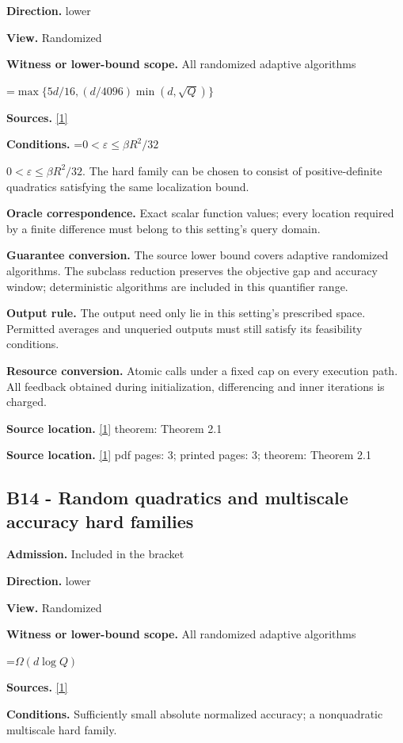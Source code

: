 \documentclass[10pt,a4paper]{article}
\newcommand{\AtlasMath}[1]{\par\begingroup\centering\setbox0=\hbox{$\displaystyle #1$}\ifdim\wd0>1.4\linewidth\typeout{ATLAS WIDE FORMULA: \the\wd0}\fi\ifdim\wd0>\linewidth\resizebox{\linewidth}{!}{\box0}\else\box0\fi\par\endgroup}
\newcommand{\AtlasInlineMath}[1]{\begingroup\setbox0=\hbox{$#1$}\ifdim\wd0>.4\linewidth\endgroup\AtlasMath{#1}\else\endgroup$#1$\fi}
\begin{document}
\textbf{Direction.} lower

\textbf{View.} Randomized

\textbf{Witness or lower-bound scope.} All randomized adaptive algorithms

\AtlasMath{\max\{5d/16,(d/4096)\min(d,\sqrt Q)\}}
\textbf{Sources.} \href{https://arxiv.org/html/2610.00345v1}{[1]}

\textbf{Conditions.} \AtlasInlineMath{0<\varepsilon\le\beta R^2/32}. The hard family can be chosen to consist of positive-definite quadratics satisfying the same localization bound.

\textbf{Oracle correspondence.} Exact scalar function values; every location required by a finite difference must belong to this setting's query domain.

\textbf{Guarantee conversion.} The source lower bound covers adaptive randomized algorithms. The subclass reduction preserves the objective gap and accuracy window; deterministic algorithms are included in this quantifier range.

\textbf{Output rule.} The output need only lie in this setting's prescribed space. Permitted averages and unqueried outputs must still satisfy its feasibility conditions.

\textbf{Resource conversion.} Atomic calls under a fixed cap on every execution path. All feedback obtained during initialization, differencing and inner iterations is charged.

\textbf{Source location.} \href{https://arxiv.org/html/2610.00345v1}{[1]} theorem: Theorem 2.1

\textbf{Source location.} \href{https://arxiv.org/html/2610.00345v1}{[1]} pdf pages: 3; printed pages: 3; theorem: Theorem 2.1

\subsection{B14 - Random quadratics and multiscale accuracy hard families}
\textbf{Admission.} Included in the bracket

\textbf{Direction.} lower

\textbf{View.} Randomized

\textbf{Witness or lower-bound scope.} All randomized adaptive algorithms

\AtlasMath{\Omega(d\log Q)}
\textbf{Sources.} \href{https://arxiv.org/html/2610.00345v1}{[1]}

\textbf{Conditions.} Sufficiently small absolute normalized accuracy; a nonquadratic multiscale hard family.
\end{document}
